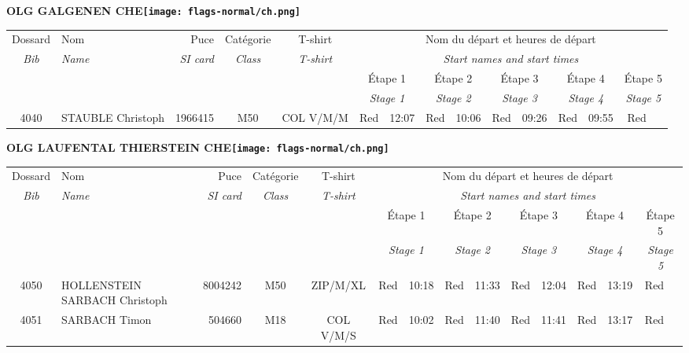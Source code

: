 \documentclass{report}
\begin{document}
\newpage
  \Huge \centering \bfseries OLG GALGENEN  CHE\normalfont \footnotesize \sffamily \hfill \texttt{[image: flags-normal/ch.png]} \newline 
  \begin{longtable}{|c|l|r|c|c|*{5}{cc|}}
    Dossard & Nom  & Puce    & Catégorie & T-shirt & \multicolumn{10}{c|}{Nom du départ et heures de départ} \\
    \itshape Bib     & \itshape Name & \itshape SI card & \itshape Class  & \itshape  T-shirt  & \multicolumn{10}{c|}{\itshape Start names and start times} \\
    \hline
    & & & & & \multicolumn{2}{c|}{Étape 1} & \multicolumn{2}{c|}{Étape 2} & \multicolumn{2}{c|}{Étape 3} & \multicolumn{2}{c|}{Étape 4} & \multicolumn{2}{c|}{Étape 5} \\
    & & & & & \multicolumn{2}{c|}{\itshape Stage 1} & \multicolumn{2}{c|}{\itshape Stage 2} & \multicolumn{2}{c|}{\itshape Stage 3} & \multicolumn{2}{c|}{\itshape Stage 4} & \multicolumn{2}{c|}{\itshape Stage 5} \\
    \hline
    4040 & STAUBLE Christoph & 1966415 & M50 & COL V/M/M & Red & 12:07 & Red & 10:06 & Red & 09:26 & Red & 09:55 & Red &  \\
  \end{longtable}
\newpage
  \Huge \centering \bfseries OLG LAUFENTAL THIERSTEIN  CHE\normalfont \footnotesize \sffamily \hfill \texttt{[image: flags-normal/ch.png]} \newline 
  \begin{longtable}{|c|l|r|c|c|*{5}{cc|}}
    Dossard & Nom  & Puce    & Catégorie & T-shirt & \multicolumn{10}{c|}{Nom du départ et heures de départ} \\
    \itshape Bib     & \itshape Name & \itshape SI card & \itshape Class  & \itshape  T-shirt  & \multicolumn{10}{c|}{\itshape Start names and start times} \\
    \hline
    & & & & & \multicolumn{2}{c|}{Étape 1} & \multicolumn{2}{c|}{Étape 2} & \multicolumn{2}{c|}{Étape 3} & \multicolumn{2}{c|}{Étape 4} & \multicolumn{2}{c|}{Étape 5} \\
    & & & & & \multicolumn{2}{c|}{\itshape Stage 1} & \multicolumn{2}{c|}{\itshape Stage 2} & \multicolumn{2}{c|}{\itshape Stage 3} & \multicolumn{2}{c|}{\itshape Stage 4} & \multicolumn{2}{c|}{\itshape Stage 5} \\
    \hline
    4050 & HOLLENSTEIN SARBACH Christoph & 8004242 & M50 & ZIP/M/XL & Red & 10:18 & Red & 11:33 & Red & 12:04 & Red & 13:19 & Red &  \\
    4051 & SARBACH Timon & 504660 & M18 & COL V/M/S & Red & 10:02 & Red & 11:40 & Red & 11:41 & Red & 13:17 & Red &  \\
  \end{longtable}
\end{document}
